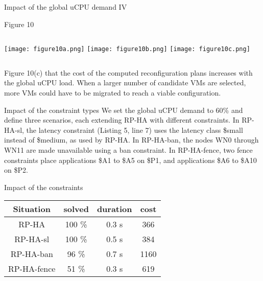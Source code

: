 \begin{frame}{ Impact of the global uCPU demand IV}

\begin{block}{Figure 10}
\begin{center}
\begin{columns}[t]
\texttt{[image: figure10a.png]}
\texttt{[image: figure10b.png]}  
\texttt{[image: figure10c.png]} 
\end{columns}
\end{center}
\end{block}

Figure 10(c) that the cost
of the computed reconfiguration plans increases with the global uCPU load.
When a larger number of candidate VMs are selected, more VMs could have to
be migrated to reach a viable configuration. 
\end{frame}

\begin{frame}{Impact of the constraint types}
We set the global uCPU demand to 60\% and define three scenarios, each extending
 RP-HA with different constraints. In RP-HA-sl, the latency constraint
(Listing 5, line 7) uses the latency class \$small instead of \$medium, as used by
RP-HA. In RP-HA-ban, the nodes WN0 through WN11 are made unavailable using a
ban constraint. In RP-HA-fence, two fence constraints place applications \$A1
to \$A5 on \$P1, and applications \$A6 to \$A10 on \$P2.

 \pause{}
\begin{block}{Impact of the constraints}
\begin{center}
\begin{tabular}{|c|c|c|c|}
\hline
Situation   & solved & duration & cost \\\hline\hline
RP-HA       & 100 \% &   0.3 s  & 366 \\ \hline
RP-HA-sl    & 100 \% &   0.5 s  & 384\\ \hline
RP-HA-ban   &  96 \% &   0.7 s  & 1160\\ \hline
RP-HA-fence &  51 \% &   0.3 s  & 619\\ \hline
\end{tabular}
\end{center}
\end{block}
\end{frame}

